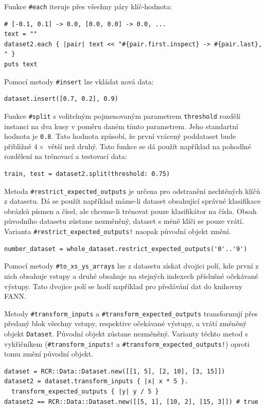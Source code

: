 \documentclass[a4paper]{article}
\begin{document}
Funkce \texttt{\#each} iteruje přes všechny páry klíč-hodnota:
\begin{lstlisting}
# [-0.1, 0.1] -> 0.0, [0.0, 0.0] -> 0.0, ...
text = ""
dataset2.each { |pair| text << "#{pair.first.inspect} -> #{pair.last}, " }
puts text
\end{lstlisting}

Pomocí metody \texttt{\#insert} lze vkládat nová data:
\begin{lstlisting}
dataset.insert([0.7, 0.2], 0.9)
\end{lstlisting}

Funkce \texttt{\#split} s volitelným pojmenovaným parametrem \texttt{threshold}
rozdělí instanci na dva kusy v poměru daném tímto parametrem. Jeho standartní
hodnota je \texttt{0.8}. Tato hodnota způsobí, že první vrácený poddataset bude
přibližně $4\times$ větší než druhý.
Tato funkce se dá použít například na pohodlné rozdělení na trénovací a
testovací data:
\begin{lstlisting}
train, test = dataset2.split(threshold: 0.75)
\end{lstlisting}

Metoda \texttt{\#restrict\_expected\_outputs} je určena pro odstranění nechtěných klíčů
z datasetu. Dá se použít například máme-li dataset obsahující správné klasifikace
obrázků písmen a čísel, ale chceme-li trénovat pouze klasifikátor na čísla.
Obsah původního datasetu zůstane nezměněný, dataset s méně klíči se pouze vrátí.
Varianta \texttt{\#restrict\_expected\_outputs!} naopak původní objekt změní.
\begin{lstlisting}
number_dataset = whole_dataset.restrict_expected_outputs('0'..'9')
\end{lstlisting}

Pomocí metody \texttt{\#to\_xs\_ys\_arrays} lze z datasetu získat dvojici polí,
kde první z nich obsahuje vstupy a druhé obsahuje na stejných indexech příslušné
očekávané výstupy. Tato dvojice polí se hodí například pro předávání dat do
knihovny FANN.

Metody \texttt{\#transform\_inputs} a \texttt{\#transform\_expected\_outputs} transformují
přes předaný blok všechny vstupy, respektive očekávané výstupy, a vrátí změněný
objekt \texttt{Dataset}. Původní objekt zůstane nezměněný.
Varianty těchto metod s vykřičníkem (\texttt{\#transform\_inputs!} a
\texttt{\#transform\_expected\_outputs!}) oproti tomu změní původní objekt.
\begin{lstlisting}
dataset = RCR::Data::Dataset.new([[1, 5], [2, 10], [3, 15]])
dataset2 = dataset.transform_inputs { |x| x * 5 }.
  transform_expected_outputs { |y| y / 5 }
dataset2 == RCR::Data::Dataset.new([[5, 1], [10, 2], [15, 3]]) # true
\end{lstlisting}
\end{document}
